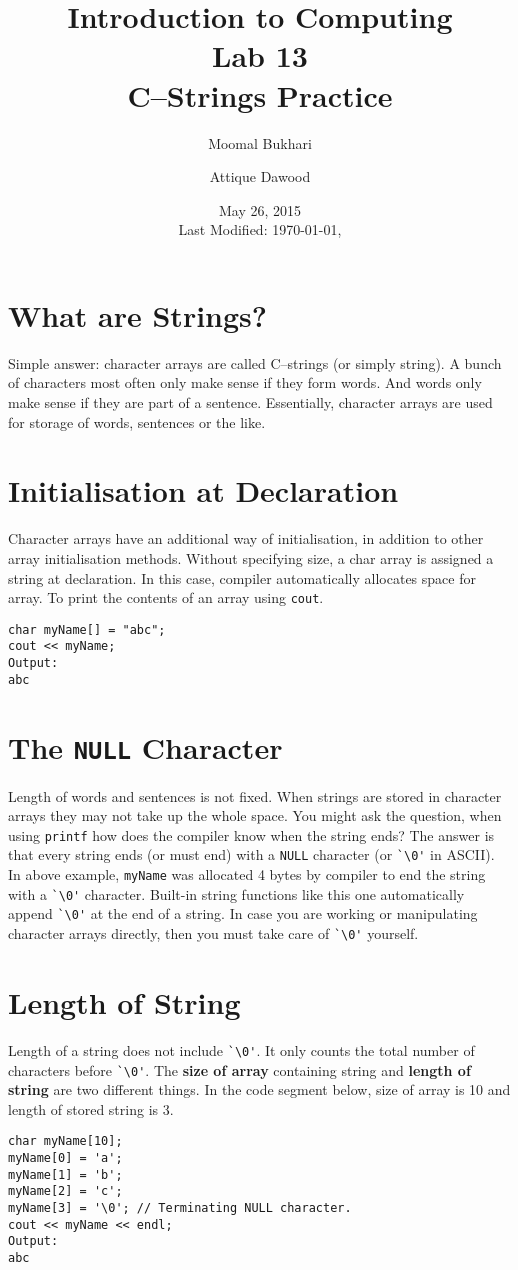 \documentclass[12pt,a4paper]{article}
\title{Introduction to Computing\\Lab 13\\C--Strings Practice}
\author{Moomal Bukhari\and Attique Dawood}
\date{May 26, 2015\\[0.2cm] Last Modified: \today, \currenttime}
\begin{document}
\maketitle
\section{What are Strings?}
Simple answer: character arrays are called C--strings (or simply string). A bunch of characters most often only make sense if they form words. And words only make sense if they are part of a sentence. Essentially, character arrays are used for storage of words, sentences or the like.
\section{Initialisation at Declaration}
Character arrays have an additional way of initialisation, in addition to other array initialisation methods. Without specifying size, a char array is assigned a string at declaration. In this case, compiler automatically allocates space for array. To print the contents of an array using \texttt{cout}.
\begin{lstlisting}
char myName[] = "abc";
cout << myName;
Output:
abc
\end{lstlisting}
\section{The \texttt{NULL} Character}
Length of words and sentences is not fixed. When strings are stored in character arrays they may not take up the whole space. You might ask the question, when using \texttt{printf} how does the compiler know when the string ends? The answer is that every string ends (or must end) with a \texttt{NULL} character (or \verb|`\0'| in ASCII). In above example, \texttt{myName} was allocated 4 bytes by compiler to end the string with a \verb|`\0'| character. Built-in string functions like this one automatically append \verb|`\0'| at the end of a string. In case you are working or manipulating character arrays directly, then you must take care of \verb|`\0'| yourself.
\section{Length of String}
Length of a string does not include \verb|`\0'|. It only counts the total number of characters before \verb|`\0'|. The \textbf{size of array} containing string and \textbf{length of string} are two different things. In the code segment below, size of array is 10 and length of stored string is 3.
\begin{lstlisting}
char myName[10];
myName[0] = 'a';
myName[1] = 'b';
myName[2] = 'c';
myName[3] = '\0'; // Terminating NULL character.
cout << myName << endl;
Output:
abc
\end{lstlisting}
\end{document}
